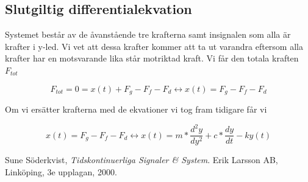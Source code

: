 \documentclass[10pt,a4paper]{article}
\begin{document}
\subsection{Slutgiltig differentialekvation}

Systemet består av de åvanstående tre krafterna samt insignalen som alla är krafter i y-led. Vi vet att dessa krafter kommer att ta ut varandra eftersom alla krafter har en motsvarande lika står motriktad kraft. Vi får den totala kraften $F_{tot}$

\begin{equation}
F_{tot} = 0 = x(t) + F_g - F_f - F_d \leftrightarrow x(t) = F_g - F_f - F_d 
\end{equation}

Om vi ersätter krafterna med de ekvationer vi tog fram tidigare får vi

\begin{equation}
x(t) = F_g - F_f - F_d \leftrightarrow x(t) = m*\frac{d^2y}{dy^2} + c*\frac{dy}{dt} -ky(t)
\end{equation}

\newpage

\begin{thebibliography}{9}

  Sune Söderkvist,
  \emph{Tidskontinuerliga Signaler \& System}.
  \linebreak
  Erik Larsson AB, Linköping,
  3e upplagan,
  2000.

\end{thebibliography}
\end{document}
